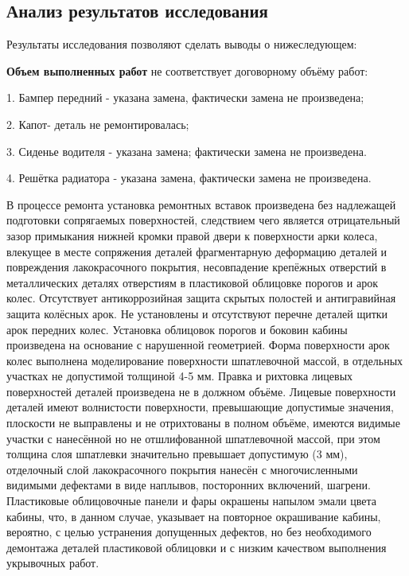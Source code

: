 { \subsection{Анализ результатов исследования}   
 
  
 
  Результаты исследования позволяют сделать выводы о нижеследующем:
  
  \indent \textbf{Объем выполненных работ} не соответствует договорному объёму работ:
  
  1. Бампер передний - указана замена, фактически замена не произведена;
  
  2. Капот- деталь  не ремонтировалась;
  
  3. Сиденье водителя - указана замена; фактически замена не произведена.
  
  4. Решётка радиатора - указана замена, фактически замена не произведена.
  
  
  
  \indent В   процессе ремонта установка ремонтных вставок произведена без надлежащей подготовки сопрягаемых поверхностей, следствием чего является отрицательный зазор примыкания нижней кромки правой двери к поверхности арки колеса, влекущее в месте сопряжения деталей фрагментарную деформацию деталей и повреждения лакокрасочного покрытия,  несовпадение крепёжных отверстий в металлических деталях отверстиям в пластиковой облицовке порогов и арок колес. Отсутствует антикоррозийная защита скрытых полостей и антигравийная защита колёсных арок. Не установлены и отсутствуют  перечне деталей щитки арок передних колес. Установка облицовок порогов и боковин кабины произведена на основание с нарушенной геометрией. Форма поверхности арок колес выполнена моделирование поверхности шпатлевочной массой, в отдельных участках не допустимой толщиной 4-5 мм. Правка и рихтовка лицевых поверхностей  деталей произведена не в должном объёме. Лицевые поверхности деталей  имеют волнистости поверхности, превышающие допустимые значения, плоскости не   выправлены и не отрихтованы в полном объёме, имеются видимые участки с нанесённой но не отшлифованной шпатлевочной массой, при этом толщина слоя шпатлевки  значительно превышает допустимую (3 мм), отделочный слой  лакокрасочного покрытия нанесён с многочисленными видимыми дефектами в виде наплывов, посторонних включений, шагрени. Пластиковые облицовочные панели и фары окрашены напылом эмали цвета кабины,  что, в данном случае, указывает на повторное окрашивание кабины, вероятно, с целью устранения допущенных дефектов, но без необходимого демонтажа деталей пластиковой облицовки и с низким качеством выполнения укрывочных работ.
  
}
